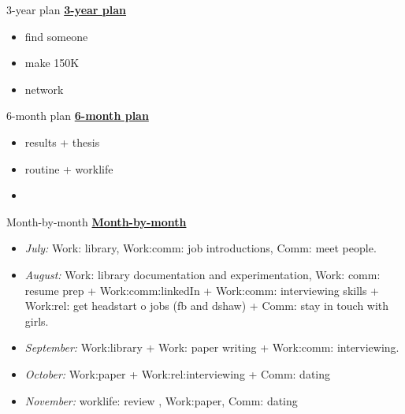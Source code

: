 \begin{columns}
\begin{column}{0.333\columnwidth}
\begin{columns}
\begin{column}{0.5\columnwidth}
\ifdefined\POSTER 
    \begin{block}{3-year plan}
\else
\underline{\bf 3-year plan} 
\fi
      \begin{itemize}
      \item \small find someone
      \item \small make 150K
      \item \small network
      \end{itemize}
\ifdefined\POSTER
    \end{block} 
\fi

\ifdefined\POSTER
    \begin{block}{6-month plan}
\else
\underline{\bf 6-month plan}
\fi
        \begin{itemize}
          \small \item \small results + thesis
          \item \small routine + worklife
          \item \small             
          \end{itemize}
\ifdefined\POSTER
    \end{block} 
\fi


\ifdefined\POSTER  
    \begin{block}{Month-by-month}
\else
\underline{\bf Month-by-month} 
\fi 
      \begin{itemize} 
      \item \small \textit{July:} Work: library, Work:comm: job
        introductions, Comm: meet people.
      \item \small \textit{August:} Work: library documentation and
      experimentation, Work: comm: resume prep + Work:comm:linkedIn +
      Work:comm: interviewing skills + Work:rel: get headstart o jobs (fb and dshaw) + Comm: stay in touch with girls. 
      \item \small \textit{September:} Work:library + Work: paper writing + Work:comm: interviewing. 
      \item \small \textit{October:} Work:paper +  Work:rel:interviewing + Comm: dating 
      \item \small \textit{November:} worklife: review , Work:paper, Comm: dating 
      \end{itemize}
\ifdefined\POSTER 
    \end{block}
\fi


\end{column}
\end{columns}
\end{column}
\end{columns}
